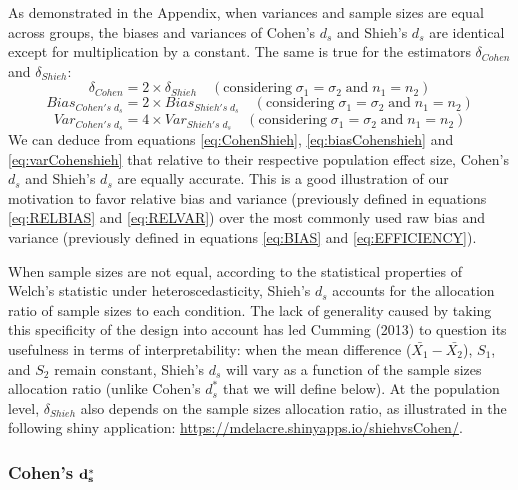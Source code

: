\documentclass[
  english,
  man,floatsintext]{apa6}
\begin{document}
As demonstrated in the Appendix, when variances and sample sizes are equal across groups, the biases and variances of Cohen's \(d_s\) and Shieh's \(d_s\) are identical except for multiplication by a constant. The same is true for the estimators \(\delta_{Cohen}\) and \(\delta_{Shieh}\):\\
\begin{equation} 
\delta_{Cohen} = 2 \times \delta_{Shieh} \quad (\mbox{considering} \; \sigma_1 = \sigma_2 \; \mbox{and} \; n_1 = n_2)
\label{eq:CohenShieh}
\end{equation}
\begin{equation} 
Bias_{Cohen's \; d{_s}} = 2 \times Bias_{Shieh's \; d{_s}} \quad (\mbox{considering} \; \sigma_1 = \sigma_2 \; \mbox{and} \; n_1 = n_2)
\label{eq:biasCohenshieh}
\end{equation}
\begin{equation} 
Var_{Cohen's \; d{_s}} = 4 \times Var_{Shieh's \; d{_s}} \quad (\mbox{considering}\; \sigma_1 = \sigma_2 \; \mbox{and} \; n_1 = n_2)
\label{eq:varCohenshieh}
\end{equation}
We can deduce from equations \ref{eq:CohenShieh}, \ref{eq:biasCohenshieh} and \ref{eq:varCohenshieh} that relative to their respective population effect size, Cohen's \(d_s\) and Shieh's \(d_s\) are equally accurate. This is a good illustration of our motivation to favor relative bias and variance (previously defined in equations \ref{eq:RELBIAS} and \ref{eq:RELVAR}) over the most commonly used raw bias and variance (previously defined in equations \ref{eq:BIAS} and \ref{eq:EFFICIENCY}).

When sample sizes are not equal, according to the statistical properties of Welch's statistic under heteroscedasticity, Shieh's \(d_s\) accounts for the allocation ratio of sample sizes to each condition. The lack of generality caused by taking this specificity of the design into account has led Cumming (2013) to question its usefulness in terms of interpretability: when the mean difference (\(\bar{X_1}-\bar{X_2}\)), \(S_1\), and \(S_2\) remain constant, Shieh's \(d_s\) will vary as a function of the sample sizes allocation ratio (unlike Cohen's \(d^*_s\) that we will define below). At the population level, \(\delta_{Shieh}\) also depends on the sample sizes allocation ratio, as illustrated in the following shiny application: \url{https://mdelacre.shinyapps.io/shiehvsCohen/}.

\hypertarget{cohens-bf-d_s}{%
\subsubsection{\texorpdfstring{Cohen's \(\bf d^*_s\)}{Cohen's \textbackslash bf d\^{}*\_s}}\label{cohens-bf-d_s}}
\end{document}
